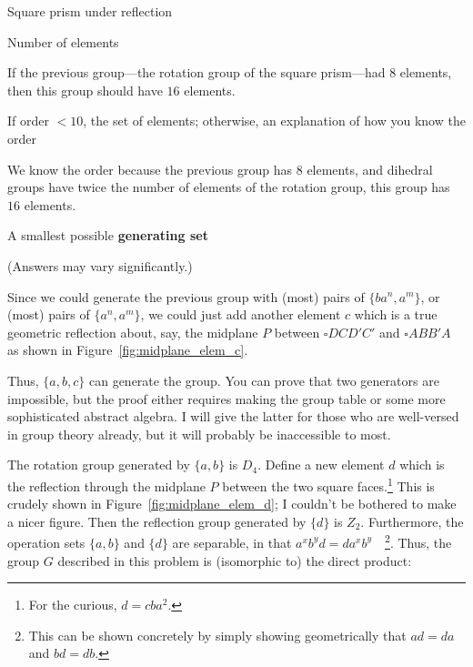 \documentclass[../key.tex]{subfiles}
\begin{document}
\begin{outer_problem}
\item Square prism under reflection
\end{outer_problem}

\begin{inner_problem}[start=1]
\item Number of elements
\end{inner_problem}

\noindent If the previous group---the rotation group of the square prism---had $8$ elements, then this group should have $16$ elements.

\begin{inner_problem}
\item If order $< 10$, the set of elements; otherwise, an explanation of how you know the order
\end{inner_problem}

\noindent We know the order because the previous group has $8$ elements, and dihedral groups have twice the number of elements of the rotation group, this group has $16$ elements.

\begin{inner_problem}
\item A smallest possible \textbf{generating set}
\end{inner_problem}

\noindent(Answers may vary significantly.)

Since we could generate the previous group with (most) pairs of $\{ba^n,a^m\}$, or (most) pairs of $\{a^n,a^m\}$, we could just add another element $c$ which is a true geometric reflection about, say, the midplane $P$ between $\square DCD'C'$ and $\square ABB'A$ as shown in Figure~\ref{fig:midplane_elem_c}.

Thus, $\{a,b,c\}$ can generate the group. You can prove that two generators are impossible, but the proof either requires making the group table or some more sophisticated abstract algebra. I will give the latter for those who are well-versed in group theory already, but it will probably be inaccessible to most.

The rotation group generated by $\{a,b\}$ is $D_4$. Define a new element $d$ which is the reflection through the midplane $P$ between the two square faces.\footnote{For the curious, $d=cba^2$.} This is crudely shown in Figure~\ref{fig:midplane_elem_d}; I couldn't be bothered to make a nicer figure. Then the reflection group generated by $\{d\}$ is $Z_2$. Furthermore, the operation sets $\{a,b\}$ and $\{d\}$ are separable, in that $a^xb^yd=da^xb^y\quad$\footnote{This can be shown concretely by simply showing geometrically that $ad=da$ and $bd=db$.}. Thus, the group $G$ described in this problem is (isomorphic to) the direct product:
\end{document}
